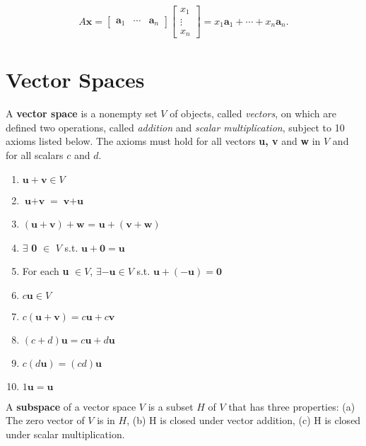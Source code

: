 \documentclass{article}
\begin{document}
\begin{equation}
    A\textbf{x} = 
    \begin{bmatrix}
    \textbf{a}_1 & \cdots & \textbf{a}_n
    \end{bmatrix}
    \begin{bmatrix}
    x_1 \\
    \vdots \\
    x_n
    \end{bmatrix}
    = x_1\textbf{a}_1 + \cdots + x_n\textbf{a}_n.
\end{equation}





\section{Vector Spaces}
A \textbf{vector space} is a nonempty set $V$ of objects, called \textit{vectors}, on which are defined two operations, called \textit{addition} and \textit{scalar multiplication}, subject to 10 axioms listed below. The axioms must hold for all vectors \textbf{u, v} and \textbf{w} in $V$ and for all scalars $c$ and $d$. 

\begin{enumerate}
    \item $\textbf{u}+\textbf{v} \in V$ 
    \item $\textbf{u}+\textbf{v}$ =  $\textbf{v}+\textbf{u}$
    \item $(\textbf{u}+\textbf{v})+\textbf{w}$ = $\textbf{u}+(\textbf{v}+\textbf{w})$
    \item $\exists$ \textbf{0} $\in$ $V$ s.t. $\textbf{u}+\textbf{0}=\textbf{u}$
    \item For each \textbf{u} $\in V$, $\exists -\textbf{u} \in V$ s.t. $\textbf{u}+(-\textbf{u})=\textbf{0}$ 
    \item $c\textbf{u} \in V$
    \item $c(\textbf{u} +\textbf{v})=c\textbf{u}+c\textbf{v}$
    \item $(c+d)\textbf{u}=c\textbf{u}+d\textbf{u}$
    \item $c(d\textbf{u}) = (cd)\textbf{u}$
    \item $1\textbf{u}=\textbf{u}$
\end{enumerate}

\noindent A \textbf{subspace} of a vector space $V$ is a subset $H$ of $V$ that has three properties: (a) The zero vector of $V$ is in $H$, (b) H is closed under vector addition, (c) H is closed under scalar multiplication.
\end{document}
